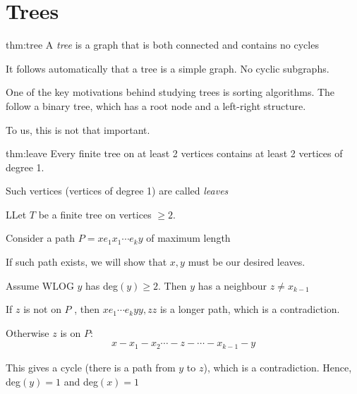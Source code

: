 \section{Trees}
\par\bigskip
\begin{theo}[Tree]{thm:tree}
  A \textit{tree} is a graph that is both connected and contains no cycles
  \par\bigskip
  \noindent It follows automatically that a tree is a simple graph. No cyclic subgraphs. 
\end{theo}
\par\bigskip
\noindent One of the key motivations behind studying trees is sorting algorithms. The follow a binary tree, which has a root node and a left-right structure.\par
\noindent To us, this is not that important.
\par\bigskip
\begin{lem}[Leaves]{thm:leave}
  Every finite tree on at least 2 vertices contains at least 2 vertices of degree 1.
  \par\bigskip
  \noindent Such vertices (vertices of degree 1) are called \textit{leaves}
\end{lem}
\par\bigskip
\begin{prf}
  LLet $T$ be a finite tree on vertices $\geq2$.\par
  \noindent Consider a path $P = xe_1x_1\cdots e_ky$ of maximum length
  \par\bigskip
  \noindent If such path exists, we will show that $x,y$ must be our desired leaves.
  \par\bigskip
  \noindent Assume WLOG $y$ has deg$(y)\geq2$. Then $y$ has a neighbour $z\neq x_{k-1}$\par
  \noindent If $z$ is not on $P$ , then $xe_1\cdots e_ky{y,z}z$ is a longer path, which is a contradiction.
  \par\bigskip
  \noindent Otherwise $z$ is on $P$:
  \begin{equation*}
    \begin{gathered}
      x-x_1-x_2\cdots-z-\cdots-x_{k-1}-y
    \end{gathered}
  \end{equation*}\par
  \noindent This gives a cycle (there is a path from $y$ to $z$), which is a contradiction. Hence, deg$(y)=1$ and deg$(x)=1$
\end{prf}
\par\bigskip
